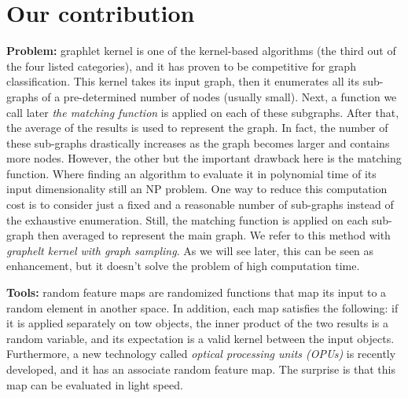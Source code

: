 \section{Our contribution}
\textbf{Problem:} graphlet kernel is one of the kernel-based algorithms (the third out of the four listed categories), and it has proven to be competitive for graph classification. This kernel takes its input graph, then it enumerates all its sub-graphs of a pre-determined number of nodes (usually small). Next, a function we call later \emph{the matching function} is applied on each of these subgraphs. After that, the average of the results is used to represent the graph. In fact, the number of these sub-graphs drastically increases as the graph becomes larger and contains more nodes. However, the other but the important drawback here is the matching function. Where finding an algorithm to evaluate it in polynomial time of its input dimensionality still an NP problem. 
One way to reduce this computation cost is to consider just a fixed and a reasonable number of sub-graphs instead of the exhaustive enumeration. Still, the matching function is applied on each sub-graph then averaged to represent the main graph. We refer to this method with \emph{graphelt kernel with graph sampling}. As we will see later, this can be seen as enhancement, but it doesn't solve the problem of high computation time.

\textbf{Tools:} random feature maps are randomized functions that map its input to a random element in another space. In addition, each map satisfies the following: if it is applied separately on tow objects,  the inner product of the two results is a random variable, and its expectation is a valid kernel between the input objects. Furthermore, a new technology called \emph{optical processing units (OPUs)} is recently developed, and it has an associate random feature map. The surprise is that this map can be evaluated in light speed.

